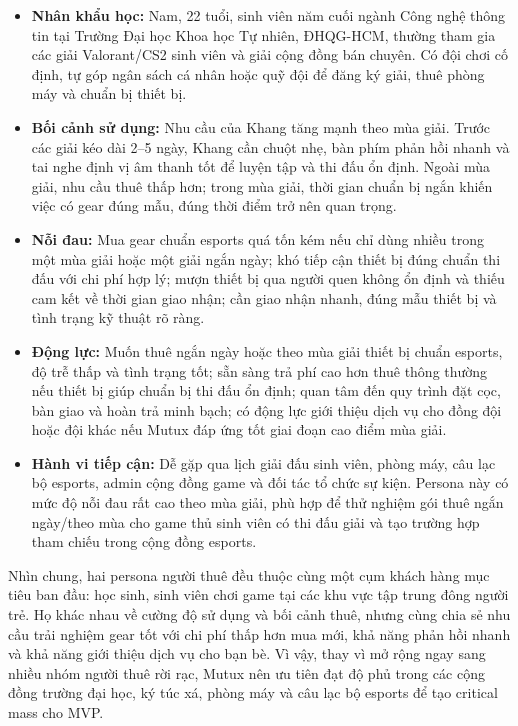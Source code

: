 \begin{itemize}
    \item \textbf{Nhân khẩu học:} Nam, 22 tuổi, sinh viên năm cuối ngành Công nghệ thông tin tại Trường Đại học Khoa học Tự nhiên, ĐHQG-HCM, thường tham gia các giải Valorant/CS2 sinh viên và giải cộng đồng bán chuyên. Có đội chơi cố định, tự góp ngân sách cá nhân hoặc quỹ đội để đăng ký giải, thuê phòng máy và chuẩn bị thiết bị.
    \item \textbf{Bối cảnh sử dụng:} Nhu cầu của Khang tăng mạnh theo mùa giải. Trước các giải kéo dài 2--5 ngày, Khang cần chuột nhẹ, bàn phím phản hồi nhanh và tai nghe định vị âm thanh tốt để luyện tập và thi đấu ổn định. Ngoài mùa giải, nhu cầu thuê thấp hơn; trong mùa giải, thời gian chuẩn bị ngắn khiến việc có gear đúng mẫu, đúng thời điểm trở nên quan trọng.
    \item \textbf{Nỗi đau:} Mua gear chuẩn esports quá tốn kém nếu chỉ dùng nhiều trong một mùa giải hoặc một giải ngắn ngày; khó tiếp cận thiết bị đúng chuẩn thi đấu với chi phí hợp lý; mượn thiết bị qua người quen không ổn định và thiếu cam kết về thời gian giao nhận; cần giao nhận nhanh, đúng mẫu thiết bị và tình trạng kỹ thuật rõ ràng.
    \item \textbf{Động lực:} Muốn thuê ngắn ngày hoặc theo mùa giải thiết bị chuẩn esports, độ trễ thấp và tình trạng tốt; sẵn sàng trả phí cao hơn thuê thông thường nếu thiết bị giúp chuẩn bị thi đấu ổn định; quan tâm đến quy trình đặt cọc, bàn giao và hoàn trả minh bạch; có động lực giới thiệu dịch vụ cho đồng đội hoặc đội khác nếu Mutux đáp ứng tốt giai đoạn cao điểm mùa giải.
    \item \textbf{Hành vi tiếp cận:} Dễ gặp qua lịch giải đấu sinh viên, phòng máy, câu lạc bộ esports, admin cộng đồng game và đối tác tổ chức sự kiện. Persona này có mức độ nỗi đau rất cao theo mùa giải, phù hợp để \projectname{} thử nghiệm gói thuê ngắn ngày/theo mùa cho game thủ sinh viên có thi đấu giải và tạo trường hợp tham chiếu trong cộng đồng esports.
\end{itemize}

Nhìn chung, hai persona người thuê đều thuộc cùng một cụm khách hàng mục tiêu ban đầu: học sinh, sinh viên chơi game tại các khu vực tập trung đông người trẻ. Họ khác nhau về cường độ sử dụng và bối cảnh thuê, nhưng cùng chia sẻ nhu cầu trải nghiệm gear tốt với chi phí thấp hơn mua mới, khả năng phản hồi nhanh và khả năng giới thiệu dịch vụ cho bạn bè. Vì vậy, thay vì mở rộng ngay sang nhiều nhóm người thuê rời rạc, Mutux nên ưu tiên đạt độ phủ trong các cộng đồng trường đại học, ký túc xá, phòng máy và câu lạc bộ esports để tạo critical mass cho MVP.

